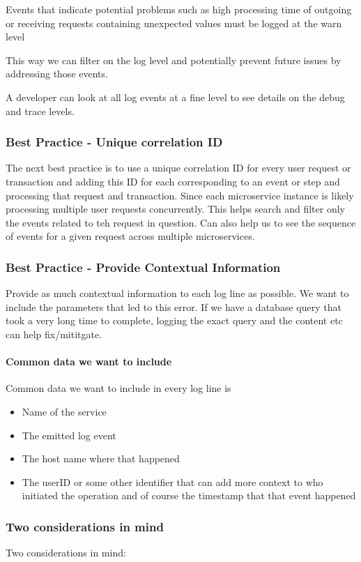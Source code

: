 Events that indicate potential problems such as high processing time of outgoing or receiving requests containing unexpected values must be logged at the warn level

This way we can filter on the log level and potentially prevent future issues by addressing those events.

A developer can look at all log events at a fine level to see details on the debug and trace levels.

\subsubsection{Best Practice - Unique correlation ID}
The next best practice is to use a unique correlation ID for every user request or transaction and adding this ID for each corresponding to an event or step and processing that request and transaction.
Since each microservice instance is likely processing multiple user requests concurrently.
This helps search and filter only the events related to teh request in question.
Can also help us to see the sequence of events for a given request across multiple microservices.

\subsubsection{Best Practice - Provide Contextual Information}
Provide as much contextual information to each log line as possible.
We want to include the parameters that led to this error.
If we have a database query that took a very long time to complete, logging the exact query and the content etc can help fix/mititgate.

\paragraph{Common data we want to include}
Common data we want to include in every log line is
\begin{itemize}
    \item Name of the service
    \item The emitted log event
    \item The host name where that happened
    \item The userID or some other identifier that can add more context to who initiated the operation and of course the timestamp that that event happened
\end{itemize}

\subsubsection{Two considerations in mind}
Two considerations in mind:

